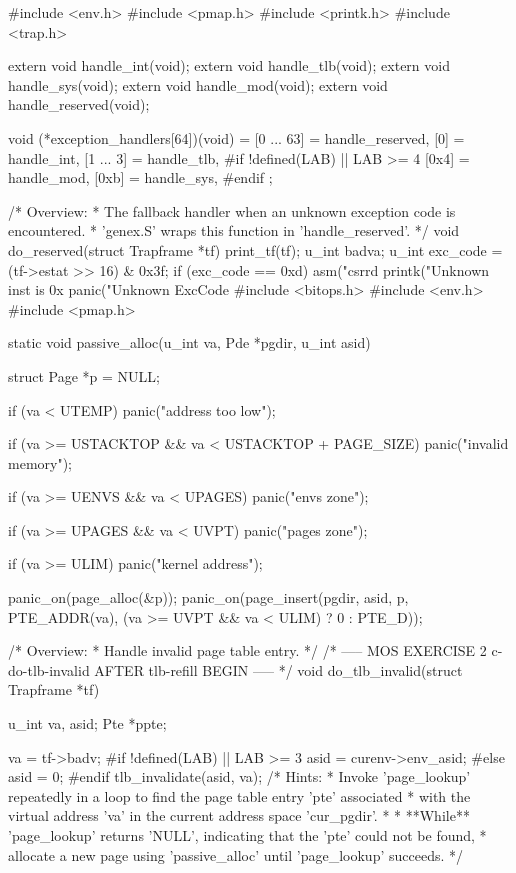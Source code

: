 \begin{CodeBlock}[language=BookC]
#include <env.h>
#include <pmap.h>
#include <printk.h>
#include <trap.h>

extern void handle_int(void);
extern void handle_tlb(void);
extern void handle_sys(void);
extern void handle_mod(void);
extern void handle_reserved(void);

void (*exception_handlers[64])(void) = {
    [0 ... 63] = handle_reserved, [0] = handle_int,   [1 ... 3] = handle_tlb,
#if !defined(LAB) || LAB >= 4
    [0x4] = handle_mod,       [0xb] = handle_sys,
#endif
};

/* Overview:
 *   The fallback handler when an unknown exception code is encountered.
 *   'genex.S' wraps this function in 'handle_reserved'.
 */
void do_reserved(struct Trapframe *tf) {
    print_tf(tf);
    u_int badva;
    u_int exc_code = (tf->estat >> 16) & 0x3f;
    if (exc_code == 0xd) {
        asm("csrrd %
        printk("Unknown inst is 0x%
    }
    panic("Unknown ExcCode %
}
#include <bitops.h>
#include <env.h>
#include <pmap.h>

static void passive_alloc(u_int va, Pde *pgdir, u_int asid) {
    struct Page *p = NULL;

    if (va < UTEMP) {
        panic("address too low");
    }

    if (va >= USTACKTOP && va < USTACKTOP + PAGE_SIZE) {
        panic("invalid memory");
    }

    if (va >= UENVS && va < UPAGES) {
        panic("envs zone");
    }

    if (va >= UPAGES && va < UVPT) {
        panic("pages zone");
    }

    if (va >= ULIM) {
        panic("kernel address");
    }

    panic_on(page_alloc(&p));
    panic_on(page_insert(pgdir, asid, p, PTE_ADDR(va), (va >= UVPT && va < ULIM) ? 0 : PTE_D));
}

/* Overview:
 *  Handle invalid page table entry.
 */
/* ----- MOS EXERCISE 2 c-do-tlb-invalid AFTER tlb-refill BEGIN ----- */
void do_tlb_invalid(struct Trapframe *tf) {
    u_int va, asid;
    Pte *ppte;

    va = tf->badv;
#if !defined(LAB) || LAB >= 3
    asid = curenv->env_asid;
#else
    asid = 0;
#endif
    tlb_invalidate(asid, va);
    /* Hints:
     *  Invoke 'page_lookup' repeatedly in a loop to find the page table entry 'pte' associated
     *  with the virtual address 'va' in the current address space 'cur_pgdir'.
     *
     *  **While** 'page_lookup' returns 'NULL', indicating that the 'pte' could not be found,
     *  allocate a new page using 'passive_alloc' until 'page_lookup' succeeds.
     */

}
\end{CodeBlock}
